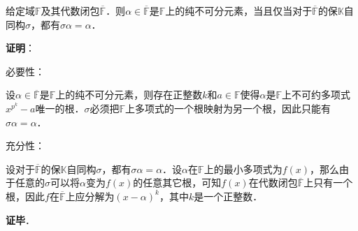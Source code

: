 \begin{theorem}{}
给定域$\mathbb{F}$及其代数闭包$\overline{\mathbb{F}}$．则$\alpha\in\overline{\mathbb{F}}$是$\mathbb{F}$上的纯不可分元素，当且仅当对于$\overline{\mathbb{F}}$的保$\mathbb{K}$自同构$\sigma$，都有$\sigma\alpha=\alpha$．
\end{theorem}

\textbf{证明}：

必要性：

设$\alpha\in\overline{\mathbb{F}}$是$\mathbb{F}$上的纯不可分元素，则存在正整数$k$和$a\in\mathbb{F}$使得$\alpha$是$\mathbb{F}$上不可约多项式$x^{p^k}-a$唯一的根．$\sigma$必须把$\mathbb{F}$上多项式的一个根映射为另一个根，因此只能有$\sigma\alpha=\alpha$．







充分性：

设对于$\overline{\mathbb{F}}$的保$\mathbb{K}$自同构$\sigma$，都有$\sigma\alpha=\alpha$．设$\alpha$在$\mathbb{F}$上的最小多项式为$f(x)$，那么由于任意的$\sigma$可以将$\alpha$变为$f(x)$的任意其它根，可知$f(x)$在代数闭包$\overline{\mathbb{F}}$上只有一个根，因此$f$在$\overline{\mathbb{F}}$上应分解为$(x-\alpha)^k$，其中$k$是一个正整数．

\textbf{证毕}．










